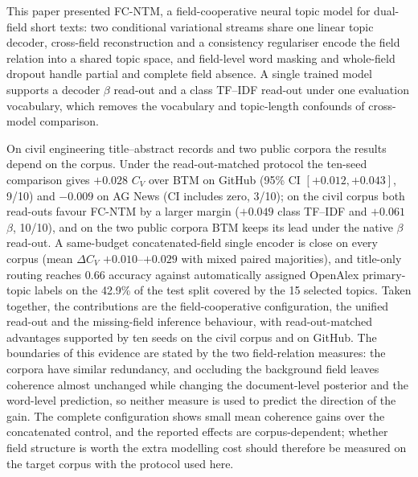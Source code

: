 \documentclass[11pt]{article}
\newcommand{\fcntm}{FC-NTM}
\begin{document}
This paper presented \fcntm{}, a field-cooperative neural topic model for dual-field short texts:
two conditional variational streams share one linear topic decoder, cross-field reconstruction and a
consistency regulariser encode the field relation into a shared topic space, and field-level word
masking and whole-field dropout handle partial and complete field absence. A single trained model
supports a decoder $\beta$ read-out and a class TF--IDF read-out under one evaluation vocabulary,
which removes the vocabulary and topic-length confounds of cross-model comparison.

On civil engineering title--abstract records and two public corpora the results depend on the
corpus. Under the read-out-matched protocol the ten-seed comparison gives $+0.028$ $C_V$ over BTM on
GitHub (95\% CI $[+0.012,+0.043]$, 9/10) and $-0.009$ on AG News (CI includes zero, 3/10); on the
civil corpus both read-outs favour \fcntm{} by a larger margin ($+0.049$ class TF--IDF and
$+0.061$ $\beta$, 10/10), and on the two public corpora BTM keeps its lead under the native $\beta$ read-out. A same-budget concatenated-field single encoder is close on every corpus (mean
$\Delta C_V$ $+0.010$--$+0.029$ with mixed paired majorities), and title-only routing reaches
0.66 accuracy against automatically assigned OpenAlex primary-topic labels on the 42.9\% of the test
split covered by the 15 selected topics. Taken together, the contributions are the field-cooperative configuration, the unified read-out
and the missing-field inference behaviour, with read-out-matched advantages supported by ten seeds on
the civil corpus and on GitHub. The boundaries of this evidence are stated by the two field-relation
measures: the corpora have similar redundancy, and occluding the background field leaves coherence
almost unchanged while changing the document-level posterior and the word-level prediction, so neither
measure is used to predict the direction of the gain. The complete configuration shows small mean
coherence gains over the concatenated control, and the reported effects are corpus-dependent;
whether field structure is worth the extra modelling cost should therefore be measured on the
target corpus with the protocol used here.
\end{document}

